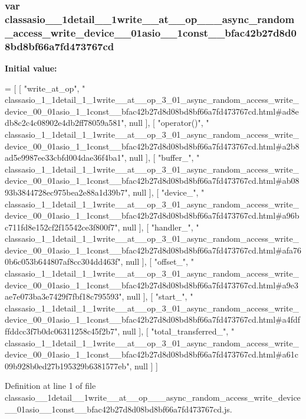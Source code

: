 \subsubsection[{classasio\+\_\+1\+\_\+1detail\+\_\+1\+\_\+1write\+\_\+\+\_\+at\+\_\+\+\_\+op\+\_\+3\+\_\+01\+\_\+async\+\_\+random\+\_\+access\+\_\+write\+\_\+device\+\_\+00\+\_\+01asio\+\_\+1\+\_\+1const\+\_\+\+\_\+bfac42b27d8d08bd8bf66a7fd473767cd}]{\setlength{\rightskip}{0pt plus 5cm}var classasio\+\_\+\_\+1detail\+\_\+\_\+1write\+\_\+\+\_\+at\+\_\+\+\_\+op\+\_\+\_\+\_\+async\+\_\+random\+\_\+access\+\_\+write\+\_\+device\+\_\+\_\+01asio\+\_\+\_\+1const\+\_\+\+\_\+bfac42b27d8d08bd8bf66a7fd473767cd}\label{classasio__1__1detail__1__1write____at____op__3__01__async__random__access__write__device__00__034bbcf9a4b2d7911235960d319dffc40_abf9b94b210404c4c9064471de02bdaed}
{\bfseries Initial value\+:}
\begin{DoxyCode}
=
[
    [ \textcolor{stringliteral}{"write\_at\_op"}, \textcolor{stringliteral}{"
      classasio\_1\_1detail\_1\_1write\_\_at\_\_op\_3\_01\_async\_random\_access\_write\_device\_00\_01asio\_1\_1const\_\_bfac42b27d8d08bd8bf66a7fd473767cd.html#ad8edb8c2c4c08902e4db2ff78059a581"}, null ],
    [ \textcolor{stringliteral}{"operator()"}, \textcolor{stringliteral}{"
      classasio\_1\_1detail\_1\_1write\_\_at\_\_op\_3\_01\_async\_random\_access\_write\_device\_00\_01asio\_1\_1const\_\_bfac42b27d8d08bd8bf66a7fd473767cd.html#a2b8ad5e9987ee33cbfd004dae36f4ba1"}, null ],
    [ \textcolor{stringliteral}{"buffer\_"}, \textcolor{stringliteral}{"
      classasio\_1\_1detail\_1\_1write\_\_at\_\_op\_3\_01\_async\_random\_access\_write\_device\_00\_01asio\_1\_1const\_\_bfac42b27d8d08bd8bf66a7fd473767cd.html#ab0893b3844728ec975bea2e88a1d39b7"}, null ],
    [ \textcolor{stringliteral}{"device\_"}, \textcolor{stringliteral}{"
      classasio\_1\_1detail\_1\_1write\_\_at\_\_op\_3\_01\_async\_random\_access\_write\_device\_00\_01asio\_1\_1const\_\_bfac42b27d8d08bd8bf66a7fd473767cd.html#a96bc711fd8e152cf2f15542ce3f800f7"}, null ],
    [ \textcolor{stringliteral}{"handler\_"}, \textcolor{stringliteral}{"
      classasio\_1\_1detail\_1\_1write\_\_at\_\_op\_3\_01\_async\_random\_access\_write\_device\_00\_01asio\_1\_1const\_\_bfac42b27d8d08bd8bf66a7fd473767cd.html#afa760b6c053b644807af8cc304dd463f"}, null ],
    [ \textcolor{stringliteral}{"offset\_"}, \textcolor{stringliteral}{"
      classasio\_1\_1detail\_1\_1write\_\_at\_\_op\_3\_01\_async\_random\_access\_write\_device\_00\_01asio\_1\_1const\_\_bfac42b27d8d08bd8bf66a7fd473767cd.html#a9e3ae7e073ba3e7429f7fbf18c795593"}, null ],
    [ \textcolor{stringliteral}{"start\_"}, \textcolor{stringliteral}{"
      classasio\_1\_1detail\_1\_1write\_\_at\_\_op\_3\_01\_async\_random\_access\_write\_device\_00\_01asio\_1\_1const\_\_bfac42b27d8d08bd8bf66a7fd473767cd.html#a4fdfffddcc3f7b0dc06311258c45f2b7"}, null ],
    [ \textcolor{stringliteral}{"total\_transferred\_"}, \textcolor{stringliteral}{"
      classasio\_1\_1detail\_1\_1write\_\_at\_\_op\_3\_01\_async\_random\_access\_write\_device\_00\_01asio\_1\_1const\_\_bfac42b27d8d08bd8bf66a7fd473767cd.html#a61c09b928b0ed27b195329b6381577eb"}, null ]
]
\end{DoxyCode}


Definition at line 1 of file classasio\+\_\+\_\+1detail\+\_\+\_\+1write\+\_\+\+\_\+at\+\_\+\+\_\+op\+\_\+\_\+\_\+async\+\_\+random\+\_\+access\+\_\+write\+\_\+device\+\_\+\_\+01asio\+\_\+\_\+1const\+\_\+\+\_\+bfac42b27d8d08bd8bf66a7fd473767cd.\+js.

